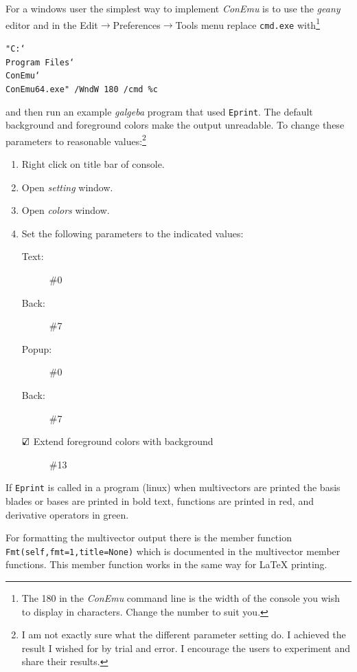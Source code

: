 \documentclass[12pt]{report}
\newcommand{\T}[1]{\texttt{#1}}
\begin{document}
For a windows user the simplest way to implement \emph{ConEmu} is to use the \emph{geany}
editor and in the Edit$\rightarrow$Preferences$\rightarrow$Tools menu replace \T{cmd.exe} with\footnote{The 180
in the \emph{ConEmu} command line is the width of the console you wish to display in characters.  Change the number to suit you.}
\begin{center}
\T{"C:\texttt{\char`\\}Program Files\texttt{\char`\\}ConEmu\texttt{\char`\\}ConEmu64.exe" /WndW 180 /cmd \%c}
\end{center}
and then run an example \emph{galgeba} program that used \T{Eprint}. The default background and foreground colors make the output
unreadable.  To change these parameters to reasonable values:\footnote{I am not exactly sure what the different parameter setting
do.  I achieved the result I wished for by trial and error.  I encourage the users to experiment and share their results.}
\begin{enumerate}
    \item Right click on title bar of console.
    \item Open \emph{setting} window.
    \item Open \emph{colors} window.
    \item Set the following parameters to the indicated values:
        \begin{description}
            \item[Text:] \#0
            \item[Back:] \#7
            \item[Popup:] \#0
            \item[Back:] \#7
            \item[$\text{\rlap{$\checkmark$}}\square$ Extend foreground colors with background] \#13
        \end{description}
\end{enumerate}

If \T{Eprint} is called in a program (linux) when multivectors are printed
the basis blades or bases are printed in bold text, functions are printed in red,
and derivative operators in green.

For formatting the multivector output there is the member function \T{Fmt(self,fmt=1,title=None)}
which is documented in the multivector member functions.  This member function works in the same 
way for {\LaTeX} printing.
\end{document}
